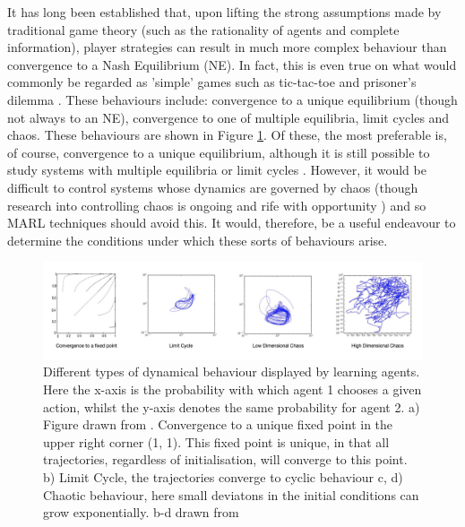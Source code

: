 \documentclass[letterpaper]{article} %
\begin{document}
    It has long been established that, upon lifting the strong
    assumptions made by traditional game theory (such as the
    rationality of agents and complete information), player
    strategies can result in much more complex behaviour than
    convergence to a Nash Equilibrium (NE). In fact, this is even true
    on what would commonly be regarded as 'simple' games such as
    tic-tac-toe and prisoner's dilemma \cite{Galla2011,
      Sato2002}. These behaviours include: convergence to a unique
    equilibrium (though not always to an NE), convergence to one of
    multiple equilibria, limit cycles and chaos. These behaviours are
    shown in Figure \ref{fig::DynamicalBehaviours}. Of these, the most
    preferable is, of course, convergence to a unique equilibrium,
    although it is still possible to study systems with multiple
    equilibria or limit cycles \cite{Strogatz2000}. However, it would
    be difficult to control systems whose dynamics are governed by
    chaos (though research into controlling chaos is ongoing and rife
    with opportunity \cite{Fradkov2009}) and so MARL techniques should
    avoid this. It would, therefore, be a useful endeavour to
    determine the conditions under which these sorts of behaviours
    arise.

    \begin{figure}[h]
        \centering
        \includegraphics[width=1.1\textwidth]{Figures/DynamicalBehaviours}
        \caption{ \label{fig::DynamicalBehaviours} Different types of dynamical behaviour
       displayed
        by learning agents. Here the x-axis is the probability with which agent 1 chooses a given action, whilst the y-axis denotes the same probability for agent 2. a) Figure drawn from \cite{Tuyls2006AnGames}.
        Convergence
        to a unique fixed point in the upper right corner (1, 1). This fixed point is unique, in
        that all trajectories, regardless of initialisation, will converge to this point. b) Limit Cycle, the trajectories converge to cyclic behaviour c,
        d) Chaotic behaviour, here small deviatons in the initial conditions can grow
        exponentially. b-d drawn from \cite{Sanders2018}}
    \end{figure}
\end{document}
